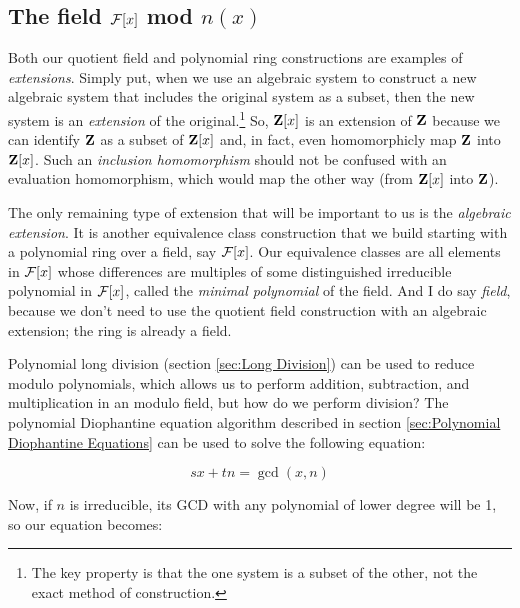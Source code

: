 \begin{comment}

\mysection{Linear Algebra}
\qquad [van der Waerden], Ch. 4, \S6.11 (trace of an field extension)

Determinants; trace.

\end{comment}

\subsection*{\qquad The field ${\cal F}[x]$ mod $n(x)$}

Both our quotient field and polynomial ring constructions are examples
of {\it extensions}.  Simply put, when we use an algebraic system to
construct a new algebraic system that includes the original system as
a subset, then the new system is an {\it extension} of the
original.\footnote{The key property is that the one system is a subset
of the other, not the exact method of construction.}  So, ${\bf Z}[x]$
is an extension of ${\bf Z}$ because we can identify ${\bf Z}$ as a
subset of ${\bf Z}[x]$ and, in fact, even homomorphicly map ${\bf Z}$
into ${\bf Z}[x]$.  Such an {\it inclusion homomorphism} should not be
confused with an evaluation homomorphism, which would map the other
way (from ${\bf Z}[x]$ into ${\bf Z}$).

The only remaining type of extension that will be important to us is
the {\it algebraic extension}.  It is another equivalence class
construction that we build starting with a polynomial ring over a
field, say ${\cal F}[x]$.  Our equivalence classes are all elements in
${\cal F}[x]$ whose differences are multiples of some distinguished
irreducible polynomial in ${\cal F}[x]$, called the {\it minimal
polynomial} of the field.  And I do say {\it field}, because we don't
need to use the quotient field construction with an algebraic
extension; the ring is already a field.

Polynomial long division (section \ref{sec:Long Division})
can be used to reduce modulo polynomials, which allows
us to perform addition, subtraction, and multiplication
in an modulo field, but how do we perform division?
The polynomial Diophantine equation algorithm
described in section \ref{sec:Polynomial Diophantine Equations}
can be used to solve the following equation:

$$sx + tn = \gcd(x,n)$$

Now, if $n$ is irreducible, its GCD with any polynomial
of lower degree will be 1, so our equation becomes:

